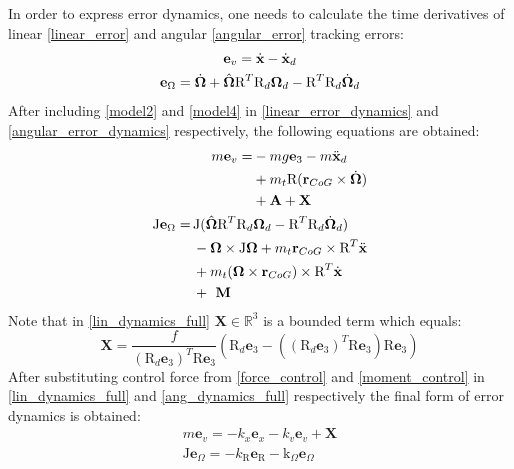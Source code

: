 In order to express error dynamics, one needs to calculate the time derivatives of linear \eqref{linear_error} and angular \eqref{angular_error} tracking errors:
\begin{gather}
	\textbf{e}_v = \dot{\textbf{x}} - \dot{\textbf{x}}_d \label{linear_error_dynamics}\\
	\textbf{e}_\Omega = \dot{\boldsymbol{\Omega}} + \hat{\boldsymbol{\Omega}}\text{R}^T\text{R}_d\boldsymbol{\Omega}_d - \text{R}^T\text{R}_d\dot{\boldsymbol{\Omega}}_d \label{angular_error_dynamics}
\end{gather}
After including \eqref{model2} and \eqref{model4} in \eqref{linear_error_dynamics} and \eqref{angular_error_dynamics} respectively, the following equations are obtained:
\begin{align}
	\label{lin_dynamics_full}
	\begin{split}
		m\textbf{e}_v = & - mg\textbf{e}_3 - m\ddot{\textbf{x}}_d \\
			& + m_t \text{R}(\textbf{r}_{CoG}  \times \dot{\boldsymbol{\Omega}}) \\
			&+ \textbf{A} + \textbf{X}	
	\end{split} \\
	\label{ang_dynamics_full}
	\begin{split}
		\text{J}\textbf{e}_\Omega =\,  &\text{J}(\hat{\boldsymbol{\Omega}}\text{R}^T\text{R}_d\boldsymbol{\Omega}_d - \text{R}^T\text{R}_d\dot{\boldsymbol{\Omega}}_d) \\
			& - \boldsymbol{\Omega} \times \text{J}\boldsymbol{\Omega} + m_t \textbf{r}_{CoG} \times \text{R}^T \ddot{\textbf{x}} \\
			& + m_t (\boldsymbol{\Omega} \times \textbf{r}_{CoG}) \times \text{R}^T \dot{\textbf{x}} \\
			& + \textbf{ M}
	\end{split}
\end{align}
Note that in \eqref{lin_dynamics_full} $\textbf{X}\in\mathbb{\text{R}}^3$ is a bounded term which equals:
\begin{equation}
	\textbf{X} = \frac{f}{(\text{R}_d\textbf{e}_3)^T\text{R}\textbf{e}_3}(\text{R}_d \textbf{e}_3 - ((\text{R}_d\textbf{e}_3)^T\text{R}\textbf{e}_3)\text{R}\textbf{e}_3)
\end{equation}
After substituting control force from \eqref{force_control} and \eqref{moment_control} in \eqref{lin_dynamics_full} and \eqref{ang_dynamics_full} respectively the final form of error dynamics is obtained:
\begin{gather}
	m\textbf{e}_v = -k_x \textbf{e}_x - k_v \textbf{e}_v + \textbf{X} \label{error_dynamics_linear}\\ 
	\text{J}\textbf{e}_\Omega = -k_\text{R} \textbf{e}_\text{R} - \text{k}_\Omega \textbf{e}_\Omega \label{error_dynamics_angular}
\end{gather}

